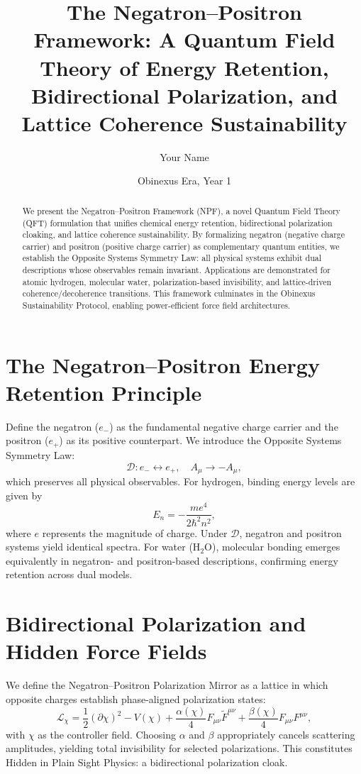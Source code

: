 \documentclass[12pt]{article}
\title{The Negatron--Positron Framework: A Quantum Field Theory of Energy Retention, Bidirectional Polarization, and Lattice Coherence Sustainability}
\author{Your Name}
\date{Obinexus Era, Year 1}
\begin{document}
\maketitle
\begin{abstract}
We present the Negatron--Positron Framework (NPF), a novel Quantum Field Theory (QFT) formulation that unifies chemical energy retention, bidirectional polarization cloaking, and lattice coherence sustainability. By formalizing negatron (negative charge carrier) and positron (positive charge carrier) as complementary quantum entities, we establish the Opposite Systems Symmetry Law: all physical systems exhibit dual descriptions whose observables remain invariant. Applications are demonstrated for atomic hydrogen, molecular water, polarization-based invisibility, and lattice-driven coherence/decoherence transitions. This framework culminates in the Obinexus Sustainability Protocol, enabling power-efficient force field architectures.
\end{abstract}
\section{The Negatron--Positron Energy Retention Principle}
Define the negatron ($e_{-}$) as the fundamental negative charge carrier and the positron ($e_{+}$) as its positive counterpart. We introduce the Opposite Systems Symmetry Law:
\begin{equation}
\mathcal{D}: e_{-} \leftrightarrow e_{+}, \quad A_\mu \to -A_\mu,
\end{equation}
which preserves all physical observables.
For hydrogen, binding energy levels are given by
\begin{equation}
E_n = -\frac{m e^4}{2 \hbar^2 n^2},
\end{equation}
where $e$ represents the magnitude of charge. Under $\mathcal{D}$, negatron and positron systems yield identical spectra. For water (H$_2$O), molecular bonding emerges equivalently in negatron- and positron-based descriptions, confirming energy retention across dual models.
\section{Bidirectional Polarization and Hidden Force Fields}
We define the Negatron--Positron Polarization Mirror as a lattice in which opposite charges establish phase-aligned polarization states:
\begin{equation}
\mathcal{L}_\chi = \frac{1}{2}(\partial \chi)^2 - V(\chi) + \frac{\alpha(\chi)}{4} F_{\mu\nu} \tilde{F}^{\mu\nu} + \frac{\beta(\chi)}{4} F_{\mu\nu} F^{\mu\nu},
\end{equation}
with $\chi$ as the controller field. Choosing $\alpha$ and $\beta$ appropriately cancels scattering amplitudes, yielding total invisibility for selected polarizations. This constitutes Hidden in Plain Sight Physics: a bidirectional polarization cloak.
\end{document}
